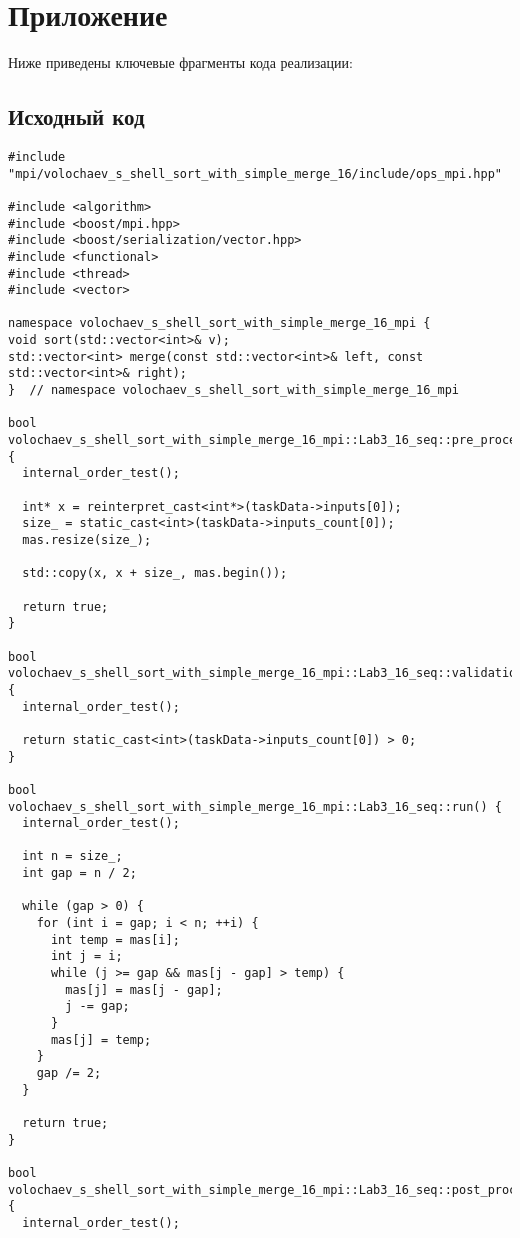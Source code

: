 \documentclass[12pt]{article}
\begin{document}
\newpage
\appendix

\section*{Приложение}
Ниже приведены ключевые фрагменты кода реализации:

\subsection*{Исходный код}
\begin{verbatim}
#include "mpi/volochaev_s_shell_sort_with_simple_merge_16/include/ops_mpi.hpp"

#include <algorithm>
#include <boost/mpi.hpp>
#include <boost/serialization/vector.hpp>
#include <functional>
#include <thread>
#include <vector>

namespace volochaev_s_shell_sort_with_simple_merge_16_mpi {
void sort(std::vector<int>& v);
std::vector<int> merge(const std::vector<int>& left, const std::vector<int>& right);
}  // namespace volochaev_s_shell_sort_with_simple_merge_16_mpi

bool volochaev_s_shell_sort_with_simple_merge_16_mpi::Lab3_16_seq::pre_processing() {
  internal_order_test();

  int* x = reinterpret_cast<int*>(taskData->inputs[0]);
  size_ = static_cast<int>(taskData->inputs_count[0]);
  mas.resize(size_);

  std::copy(x, x + size_, mas.begin());

  return true;
}

bool volochaev_s_shell_sort_with_simple_merge_16_mpi::Lab3_16_seq::validation() {
  internal_order_test();

  return static_cast<int>(taskData->inputs_count[0]) > 0;
}

bool volochaev_s_shell_sort_with_simple_merge_16_mpi::Lab3_16_seq::run() {
  internal_order_test();

  int n = size_;
  int gap = n / 2;

  while (gap > 0) {
    for (int i = gap; i < n; ++i) {
      int temp = mas[i];
      int j = i;
      while (j >= gap && mas[j - gap] > temp) {
        mas[j] = mas[j - gap];
        j -= gap;
      }
      mas[j] = temp;
    }
    gap /= 2;
  }

  return true;
}

bool volochaev_s_shell_sort_with_simple_merge_16_mpi::Lab3_16_seq::post_processing() {
  internal_order_test();


\end{verbatim}
\end{document}
